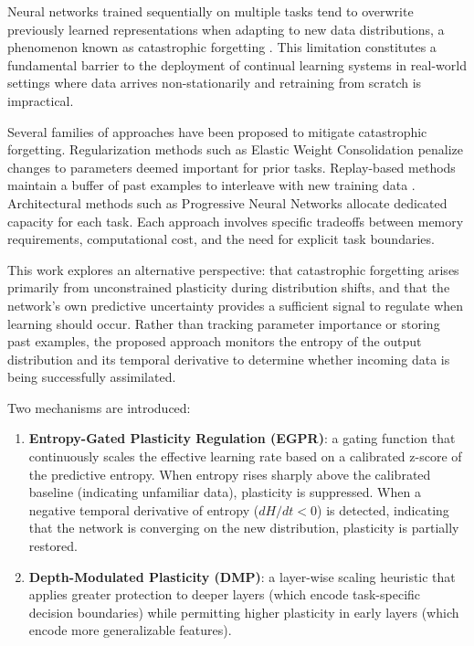 \documentclass[11pt,a4paper]{article}
\begin{document}
Neural networks trained sequentially on multiple tasks tend to overwrite previously learned representations when adapting to new data distributions, a phenomenon known as catastrophic forgetting \citep{mccloskey1989catastrophic,french1999catastrophic}. This limitation constitutes a fundamental barrier to the deployment of continual learning systems in real-world settings where data arrives non-stationarily and retraining from scratch is impractical.

Several families of approaches have been proposed to mitigate catastrophic forgetting. Regularization methods such as Elastic Weight Consolidation \citep[EWC;][]{kirkpatrick2017overcoming} penalize changes to parameters deemed important for prior tasks. Replay-based methods maintain a buffer of past examples to interleave with new training data \citep{chaudhry2019efficient}. Architectural methods such as Progressive Neural Networks \citep{rusu2016progressive} allocate dedicated capacity for each task. Each approach involves specific tradeoffs between memory requirements, computational cost, and the need for explicit task boundaries.

This work explores an alternative perspective: that catastrophic forgetting arises primarily from unconstrained plasticity during distribution shifts, and that the network's own predictive uncertainty provides a sufficient signal to regulate when learning should occur. Rather than tracking parameter importance or storing past examples, the proposed approach monitors the entropy of the output distribution and its temporal derivative to determine whether incoming data is being successfully assimilated.

Two mechanisms are introduced:

\begin{enumerate}
    \item \textbf{Entropy-Gated Plasticity Regulation (EGPR)}: a gating function that continuously scales the effective learning rate based on a calibrated z-score of the predictive entropy. When entropy rises sharply above the calibrated baseline (indicating unfamiliar data), plasticity is suppressed. When a negative temporal derivative of entropy ($dH/dt < 0$) is detected, indicating that the network is converging on the new distribution, plasticity is partially restored.
    \item \textbf{Depth-Modulated Plasticity (DMP)}: a layer-wise scaling heuristic that applies greater protection to deeper layers (which encode task-specific decision boundaries) while permitting higher plasticity in early layers (which encode more generalizable features).
\end{enumerate}
\end{document}
